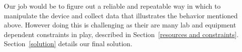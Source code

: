 \documentclass{article}
\begin{document}
        Our job would be to figure out a reliable and repeatable way in which to manipulate the device and collect data
        that illustrates the behavior mentioned above. However doing this is challenging as their are many lab and
        equipment dependent constraints in play, described in Section~\ref{resources and constraints}.
        Section~\ref{solution} details our final solution. 

\end{document}
